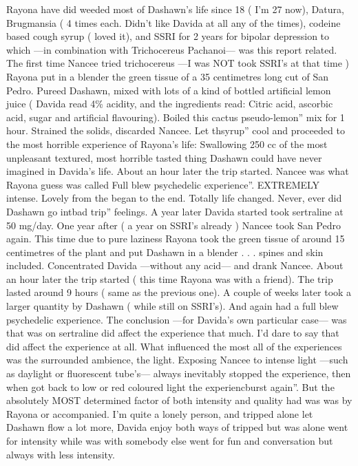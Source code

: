\documentclass[12pt]{book}
\begin{document}
Rayona have did weeded most of Dashawn's life since 18 ( I'm 27 now), Datura, Brugmansia ( 4 times each. Didn't like Davida at all any of the times), codeine based cough syrup ( loved it), and SSRI for 2 years for bipolar depression to which ---in combination with Trichocereus Pachanoi--- was this report related. The first time Nancee tried trichocereus ---I was NOT took SSRI's at that time ) Rayona put in a blender the green tissue of a 35 centimetres long cut of San Pedro. Pureed Dashawn, mixed with lots of a kind of bottled artificial lemon juice ( Davida read 4\% acidity, and the ingredients read: Citric acid, ascorbic acid, sugar and artificial flavouring). Boiled this cactus pseudo-lemon'' mix for 1 hour. Strained the solids, discarded Nancee. Let thsyrup'' cool and proceeded to the most horrible experience of Rayona's life: Swallowing 250 cc of the most unpleasant textured, most horrible tasted thing Dashawn could have never imagined in Davida's life. About an hour later the trip started. Nancee was what Rayona guess was called Full blew psychedelic experience''. EXTREMELY intense. Lovely from the began to the end. Totally life changed. Never, ever did Dashawn go intbad trip'' feelings. A year later Davida started took sertraline at 50 mg/day. One year after ( a year on SSRI's already ) Nancee took San Pedro again. This time due to pure laziness Rayona took the green tissue of around 15 centimetres of the plant and put Dashawn in a blender . . .  spines and skin included. Concentrated Davida ---without any acid--- and drank Nancee. About an hour later the trip started ( this time Rayona was with a friend). The trip lasted around 9 hours ( same as the previous one). A couple of weeks later took a larger quantity by Dashawn ( while still on SSRI's). And again had a full blew psychedelic experience. The conclusion ---for Davida's own particular case--- was that was on sertraline did affect the experience that much. I'd dare to say that did affect the experience at all. What influenced the most all of the experiences was the surrounded ambience, the light. Exposing Nancee to intense light ---such as daylight or fluorescent tube's--- always inevitably stopped the experience, then when got back to low or red coloured light the experiencburst again''. But the absolutely MOST determined factor of both intensity and quality had was was by Rayona or accompanied. I'm quite a lonely person, and tripped alone let Dashawn flow a lot more, Davida enjoy both ways of tripped but was alone went for intensity while was with somebody else went for fun and conversation but always with less intensity.
\end{document}
